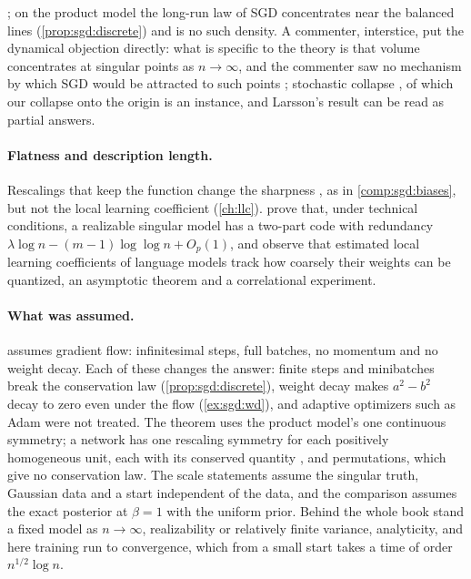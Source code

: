 \begin{refsection}
\parencite{Erdil2023}; on the product model the long-run law of SGD concentrates near the balanced lines (\cref{prop:sgd:discrete}) and is no such density. A commenter, interstice, put the dynamical objection directly: what is specific to the theory is that volume concentrates at singular points as $n\to\infty$, and the commenter saw no mechanism by which SGD would be attracted to such points \parencite{interstice2023}; stochastic collapse \parencite{ChenEtAl2023b}, of which our collapse onto the origin is an instance, and Larsson's result \parencite{Larsson2026} can be read as partial answers.

\paragraph{Flatness and description length.} Rescalings that keep the function change the sharpness \parencite{DinhEtAl2017}, as in \cref{comp:sgd:biases}, but not the local learning coefficient (\cref{ch:llc}). \Textcite{UrdshalsEtAl2025} prove that, under technical conditions, a realizable singular model has a two-part code with redundancy $\lambda\log n-(m-1)\log\log n+O_p(1)$, and observe that estimated local learning coefficients of language models track how coarsely their weights can be quantized, an asymptotic theorem and a correlational experiment.

\paragraph{What was assumed.}  assumes gradient flow: infinitesimal steps, full batches, no momentum and no weight decay. Each of these changes the answer: finite steps and minibatches break the conservation law (\cref{prop:sgd:discrete}), weight decay makes $a^2-b^2$ decay to zero even under the flow (\cref{ex:sgd:wd}), and adaptive optimizers such as Adam were not treated. The theorem uses the product model's one continuous symmetry; a network has one rescaling symmetry for each positively homogeneous unit, each with its conserved quantity \parencite{DuEtAl2018}, and permutations, which give no conservation law. The scale statements assume the singular truth, Gaussian data and a start independent of the data, and the comparison assumes the exact posterior at $\beta=1$ with the uniform prior. Behind the whole book stand a fixed model as $n\to\infty$, realizability or relatively finite variance, analyticity, and here training run to convergence, which from a small start takes a time of order $n^{1/2}\log n$.


\end{refsection}
